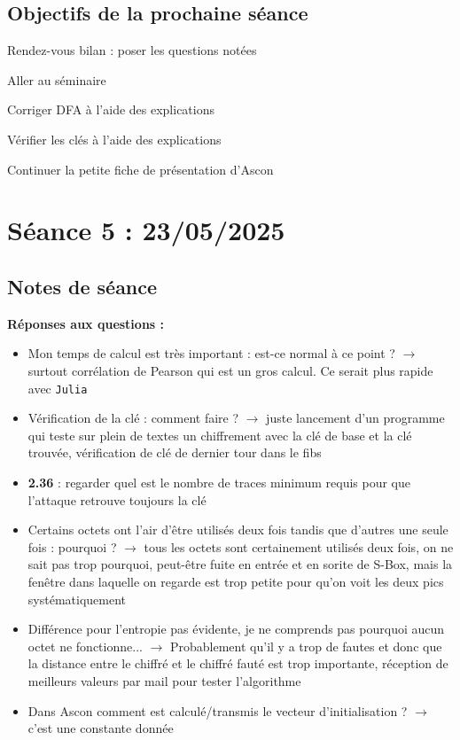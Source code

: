 \documentclass[12pt]{article}
\newcommand{\cmark}{\ding{51}}%
\newcommand{\xmark}{\ding{55}}%
\newcommand{\done}{\rlap{$\square$}{\raisebox{2pt}{\large\hspace{1pt}\cmark}}%
	\hspace{-2.5pt}}
\newcommand{\wontfix}{\rlap{$\square$}{\large\hspace{1pt}\xmark}}
\begin{document}
	\subsection{Objectifs de la prochaine séance}
	\begin{todolist}
		\item[\done] Rendez-vous bilan : poser les questions notées
		\item[\done] Aller au séminaire
		\item[\wontfix] Corriger DFA à l'aide des explications
		\item[\done] Vérifier les clés à l'aide des explications
		\item[\done] Continuer la petite fiche de présentation d'Ascon
	\end{todolist}
	
	
	\section{Séance 5 : 23/05/2025}
	\subsection{Notes de séance}
	\noindent \textbf{Réponses aux questions :}
		\begin{itemize}
		\item Mon temps de calcul est très important : est-ce normal à ce point ? $\rightarrow$ surtout corrélation de Pearson qui est un gros calcul. Ce serait plus rapide avec \verb|Julia|
		\item Vérification de la clé : comment faire ? $\rightarrow$ juste lancement d'un programme qui teste sur plein de textes un chiffrement avec la clé de base et la clé trouvée, vérification de clé de dernier tour dans le fibs
		\item \textbf{2.36} : regarder quel est le nombre de traces minimum requis pour que l'attaque retrouve toujours la clé
		\item Certains octets ont l'air d'être utilisés deux fois tandis que d'autres une seule fois : pourquoi ? $\rightarrow$ tous les octets sont certainement utilisés deux fois, on ne sait pas trop pourquoi, peut-être fuite en entrée et en sorite de S-Box, mais la fenêtre dans laquelle on regarde est trop petite pour qu'on voit les deux pics systématiquement
		\item Différence pour l'entropie pas évidente, je ne comprends pas pourquoi aucun octet ne fonctionne... $\rightarrow$ Probablement qu'il y a trop de fautes et donc que la distance entre le chiffré et le chiffré fauté est trop importante, réception de meilleurs valeurs par mail pour tester l'algorithme 
		\item Dans Ascon comment est calculé/transmis le vecteur d'initialisation ? $\rightarrow$ c'est une constante donnée
	\end{itemize}
	
\end{document}
